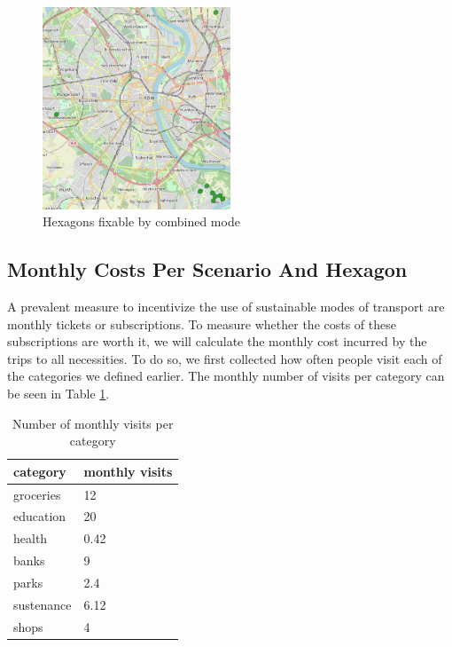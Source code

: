 \begin{figure}
  \begin{center}
    \includegraphics[width=0.50\textwidth]{Figures/results/problematic_hexagons/combined_hexagons}
  \end{center}
  \caption{Hexagons fixable by combined mode}
  \label{fig:combined_hexagons}
\end{figure}


\subsection{Monthly Costs Per Scenario And Hexagon}

A prevalent measure to incentivize the use of sustainable modes of transport are monthly tickets or subscriptions.
To measure whether the costs of these subscriptions are worth it, we will calculate the monthly cost incurred by the trips to all necessities.
To do so, we first collected how often people visit each of the categories we defined earlier.
The monthly number of visits per category can be seen in Table \ref{tab:monthly_visits}.

\begin{table}
  \caption{Number of monthly visits per category}
  \label{tab:monthly_visits}
  \begin{center}
    \begin{tabular}[c]{l|l}
      category & monthly visits \\
      \hline
      groceries & 12 \\
      education & 20 \\
      health & 0.42 \\
      banks & 9 \\
      parks & 2.4 \\
      sustenance & 6.12 \\
      shops & 4 \\
      \hline
    \end{tabular}
  \end{center}
\end{table}

